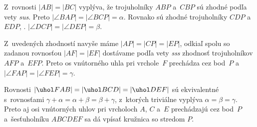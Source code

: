 {Z~rovnosti $|AB|=|BC|$ vyplýva, že trojuholníky $ABP$ a~$CBP$ sú zhodné podľa vety {\it sus}. Preto $|\angle BAP|=|\angle BCP|=\alpha$. Rovnako sú zhodné trojuholníky $CDP$ a~$EDP$, \tj. $|\angle DCP|=|\angle DEP|=\beta$.

Z~uvedených zhodností navyše máme $|AP|=|CP|=|EP|$, odkiaľ spolu so zadanou rovnosťou $|AF|=|EF|$ dostávame podľa vety {\it sss\/} zhodnosť trojuholníkov $AFP$ a~$EFP$. Preto os vnútorného uhla pri vrchole~$F$ prechádza cez bod~$P$ a~$|\angle FAP|=|\angle FEP|=\gamma$.

Rovnosti $|\uhol FAB|=|\uhol BCD|=|\uhol DEF|$ sú ekvivalentné s~rovnosťami $\gamma+\alpha=\alpha+\beta=\beta+\gamma$, z~ktorých triviálne vyplýva $\alpha=\beta=\gamma$. Preto aj osi vnútorných uhlov pri vrcholoch $A$, $C$ a~$E$ prechádzajú cez bod~$P$ a~šesťuholníku $ABCDEF$ sa dá vpísať kružnica so stredom $P$.
}

